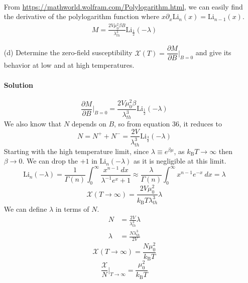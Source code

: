 \documentclass{article}
\begin{document}
\begin{enumerate}
\begin{align}
		\end{align}
		From \href{https://mathworld.wolfram.com/Polylogarithm.html}{https://mathworld.wolfram.com/Polylogarithm.html}, we can easily find the derivative of the polylogarithm function where $x \partial_x \mathrm{Li}_n(x) = \mathrm{Li}_{n-1}(x)$.
		\begin{align}
			\boxed{M = \frac{2V\mu^2_0 \beta B}{\lambda^3_{th}} \mathrm{Li}_{\frac{1}{2}}(-\lambda)}
		\end{align}
		
\clearpage
		
		\item[(d)] Determine the zero-field susceptibility $\mathcal{X}(T) = \dfrac{\partial M}{\partial B} \bigg|_{B=0}$ and give its behavior at low and at high temperatures.
		\paragraph{Solution}
		\begin{equation}
			\frac{\partial M}{\partial B} \bigg|_{B=0} = \frac{2V\mu^2_0 \beta}{\lambda^3_{th}} \mathrm{Li}_{\frac{1}{2}}(-\lambda)
		\end{equation}
		We also know that $N$ depends on $B$, so from equation 36, it reduces to
		\begin{equation}
			N = N^+ + N^- = \frac{2V}{\lambda^3_{th}} \mathrm{Li}_{\frac{3}{2}}(-\lambda)
		\end{equation}		
		Starting with the high temperature limit, since $\lambda \equiv e^{\beta\mu}$, as $k_\mathrm{B}T \to \infty$ then $\beta \to 0$. We can drop the $+1$ in $\mathrm{Li}_n(-\lambda)$ as it is negligible at this limit.
		\begin{equation}
			\mathrm{Li}_n(-\lambda) = \frac{1}{\Gamma(n)} \int_{0}^{\infty} \frac{x^{n-1} \ dx}{\lambda^{-1} e^x + 1} \approx \frac{\lambda}{\Gamma(n)} \int_{0}^{\infty} x^{n-1} e^{-x} \ dx = \lambda
		\end{equation}
		\begin{equation}
			\mathcal{X}(T \to \infty) = \frac{2V\mu^2_0}{k_\mathrm{B} T \lambda^3_{th}} \lambda
		\end{equation}
		We can define $\lambda$ in terms of $N$.
		\begin{align}
			N &= \frac{2V}{\lambda^3_{th}} \lambda \\
			\lambda &= \frac{N\lambda^3_{th}}{2V}
		\end{align}
		\begin{equation}
			\mathcal{X}(T \to \infty) = \frac{N\mu^2_0}{k_\mathrm{B} T}
		\end{equation}
		\begin{equation}
			\boxed{\frac{\mathcal{X}}{N} \biggr|_{T\to\infty} = \frac{\mu_0^2}{k_\mathrm{B} T}}
		\end{equation}
		

\end{enumerate}
\end{document}

